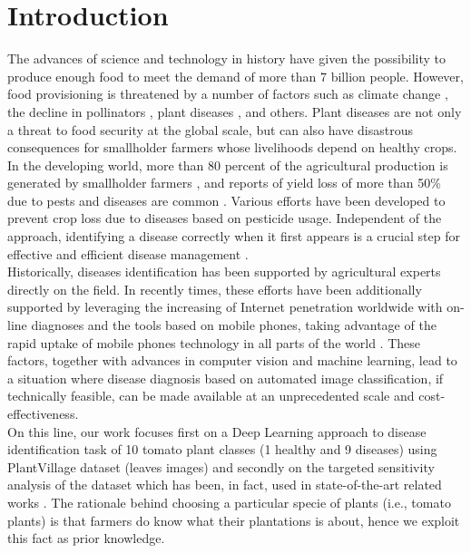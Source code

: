 \section{Introduction}
The advances of science and technology in history have given the possibility to produce enough food to meet the demand of more than 7 billion people. However, food provisioning is threatened by a number of factors such as climate change \cite{ref1}, the decline in pollinators \cite{ref2}, plant diseases \cite{ref3}, and others. Plant diseases are not only a threat to food security at the global scale, but can also have disastrous consequences for smallholder farmers whose livelihoods depend on healthy crops. In the developing world, more than 80 percent of the agricultural production is generated by smallholder farmers \cite{ref5}, and reports of yield loss of more than 50\% due to pests and diseases are common \cite{ref6}.
Various efforts have been developed to prevent crop loss due to diseases based on pesticide usage. Independent of the approach, identifying a disease correctly when it first appears is a crucial step for effective and efficient disease management \cite{ref8}.
\\\indent
Historically, diseases identification has been supported by agricultural experts directly on the field. In recently times, these efforts have been additionally supported by leveraging the increasing of Internet penetration worldwide with on-line diagnoses and the tools based on mobile phones, taking advantage of the rapid uptake of mobile phones technology in all parts of the world \cite{ref9}. These factors, together with advances in computer vision and machine learning, lead to a situation where disease diagnosis based on automated image classification, if technically feasible, can be made available at an unprecedented scale and cost-effectiveness.
\\\indent
On this line, our work focuses first on a Deep Learning approach to disease identification task of 10 tomato plant classes (1 healthy and 9 diseases) using PlantVillage dataset (leaves images) \cite{PlantVillage} and secondly on the targeted sensitivity analysis of the dataset which has been, in fact, used in state-of-the-art related works \cite{ref11, ref10}. The rationale behind choosing a particular specie of plants (i.e., tomato plants) is that farmers do know what their plantations is about, hence we exploit this fact as prior knowledge.
\\\indent
